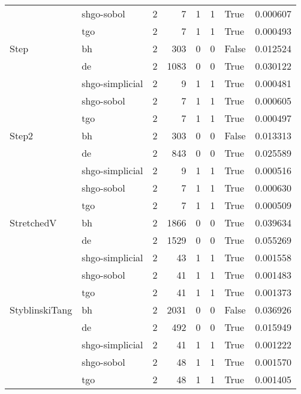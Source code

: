 \begin{longtable}{llrrrrlr}
         & shgo-sobol &     2 &        7 &      1 &       1 &    True &    0.000607 \\
         & tgo &     2 &        7 &      1 &       1 &    True &    0.000493 \\
Step & bh &     2 &      303 &      0 &       0 &   False &    0.012524 \\
         & de &     2 &     1083 &      0 &       0 &    True &    0.030122 \\
         & shgo-simplicial &     2 &        9 &      1 &       1 &    True &    0.000481 \\
         & shgo-sobol &     2 &        7 &      1 &       1 &    True &    0.000605 \\
         & tgo &     2 &        7 &      1 &       1 &    True &    0.000497 \\
Step2 & bh &     2 &      303 &      0 &       0 &   False &    0.013313 \\
         & de &     2 &      843 &      0 &       0 &    True &    0.025589 \\
         & shgo-simplicial &     2 &        9 &      1 &       1 &    True &    0.000516 \\
         & shgo-sobol &     2 &        7 &      1 &       1 &    True &    0.000630 \\
         & tgo &     2 &        7 &      1 &       1 &    True &    0.000509 \\
StretchedV & bh &     2 &     1866 &      0 &       0 &    True &    0.039634 \\
         & de &     2 &     1529 &      0 &       0 &    True &    0.055269 \\
         & shgo-simplicial &     2 &       43 &      1 &       1 &    True &    0.001558 \\
         & shgo-sobol &     2 &       41 &      1 &       1 &    True &    0.001483 \\
         & tgo &     2 &       41 &      1 &       1 &    True &    0.001373 \\
StyblinskiTang & bh &     2 &     2031 &      0 &       0 &   False &    0.036926 \\
         & de &     2 &      492 &      0 &       0 &    True &    0.015949 \\
         & shgo-simplicial &     2 &       41 &      1 &       1 &    True &    0.001222 \\
         & shgo-sobol &     2 &       48 &      1 &       1 &    True &    0.001570 \\
         & tgo &     2 &       48 &      1 &       1 &    True &    0.001405 \\

\end{longtable}
